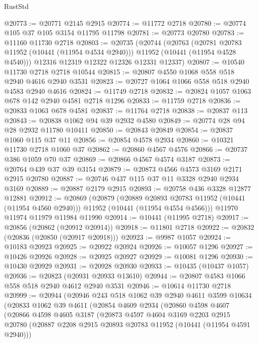 \begin{lexlean}{RustStd}
\begin{coremodule}
@20773 := @20771 @2145 @2915
@20774 := @11772 @2718
@20780 := @20774 @105 @37 @105 @3154 @11795 @11798
@20781 := @20773 @20780
@20783 := @11160 @11730 @2718
@20803 := @20735
    (@20744
      (@20763
        (@20781 @20783 @11952 (@10441 (@11954 @4534 @2940)))
        @11952
        (@10441 (@11954 @4528 @4540)))
      @12316
      @12319
      @12322
      @12326
      @12331
      @12337)
@20807 := @10540 @11730 @2718 @2718 @10544
@20815 := @20807 @4550 @1068 @558 @518 @2940 @4616 @2940 @3531
@20823 := @20727 @1064 @1066 @558 @518 @2940 @4583 @2940 @4616
@20824 := @11749 @2718
@20832 := @20824 @1057 @1063 @678 @142 @2940 @4581 @2718 @1296
@20833 := @11759 @2718
@20836 := @20833 @1063 @678 @4581
@20837 := @11764 @2718
@20838 := @20837 @113
@20843 := @20838 @1062 @94 @39 @2932 @4580
@20849 := @20774 @28 @94 @28 @2932 @11780 @10411
@20850 := @20843 @20849
@20854 := @20837 @1060 @115 @37 @11
@20856 := @20854 @4578 @2934
@20860 := @10321 @11730 @2718 @1060 @37
@20862 := @20860 @4567 @4576
@20866 := @20737 @386 @1059 @70 @37
@20869 := @20866 @4567 @4574 @3187
@20873 := @20764 @439 @37 @39 @3154
@20879 := @20873 @4566 @4573 @3169 @2171 @2915 @20780
@20887 := @20746 @437 @115 @37 @11 @3328 @2940 @2934 @3169
@20889 := @20887 @2179 @2915
@20893 := @20758 @436 @3328 @12877 @12881
@20912 := @20869
    (@20879
      (@20889 @20893 @20783 @11952 (@10441 (@11954 @4560 @2940)))
      @11952
      (@10441 (@11954 @4554 @4566)))
    @11970
    @11974
    @11979
    @11984
    @11990
@20914 := @10441 (@11995 @2718)
@20917 := @20856 (@20862 (@20912 @20914))
@20918 := @11801 @2718
@20922 := @20832 (@20836 (@20850 (@20917 @20918)))
@20923 := @9987 @1057
@20924 := @10183 @20923
@20925 := @20922 @20924
@20926 := @10057 @1296
@20927 := @10426 @20926
@20928 := @20925 @20927
@20929 := @10081 @1296
@20930 := @10430 @20929
@20931 := @20928 @20930
@20933 := @10435 (@10437 @1057)
@20936 := @20823 (@20931 @20933 @13610)
@20944 := @20807 @4583 @1066 @558 @518 @2940 @4612 @2940 @3531
@20946 := @10614 @11730 @2718
@20999 := @20944
    (@20946
      @243
      @518
      @1062
      @39
      @2940
      @4611
      @3599
      @10634
      (@20833
        @1062
        @39
        @4611
        (@20854
          @4609
          @2934
          (@20860
            @4598
            @4607
            (@20866
              @4598
              @4605
              @3187
              (@20873
                @4597
                @4604
                @3169
                @2203
                @2915
                @20780
                (@20887 @2208 @2915 @20893 @20783 @11952 (@10441 (@11954 @4591 @2940)))

\end{coremodule}
\end{lexlean}
